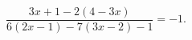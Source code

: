 \begin{ex}[type=equation]
	\begin{condition}
		$\dfrac{3x + 1-2(4 - 3x)}{6(2x - 1)-7(3x - 2) - 1} = -1.$
	\end{condition}
\end{ex}